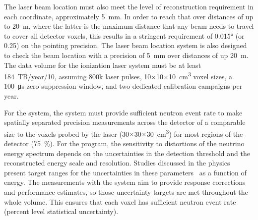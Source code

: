 The laser beam location must also meet the level of reconstruction requirement in each coordinate, approximately \SI{5}{\milli\m}. In order to reach that over distances of up to \SI{20}{\m}, where the latter is the maximum distance that any beam needs to travel to cover all detector voxels, this results in a stringent requirement of \ang{0.015} (or \SI{0.25}{\mrad}) on the pointing precision. The laser beam location system is also designed to check the beam location with a precision of \SI{5}{\milli\m} over distances of up \SI{20}{\m}.
The data volume for the ionization laser system must be at least \num{184}~TB/year/\SI{10}{\kt}, assuming \num{800}k laser pulses, \num{10}$\times$\num{10}$\times$\SI{10}{\cubic\cm} voxel sizes, a \SI{100}{\micro\s} zero suppression window, and two dedicated calibration campaigns per year.

For the  system, the system must provide sufficient neutron event rate to make spatially separated precision measurements across the detector of a comparable size to the voxels probed by the laser (\num{30}$\times$\num{30}$\times$\SI{30}{\cubic\cm}) for most regions of the detector (\SI{75}{\%}). 
For the  program, the sensitivity to distortions of the neutrino energy spectrum depends on the uncertainties in the detection threshold and the reconstructed energy scale and resolution. Studies discussed in the physics  present target ranges for the uncertainties in these parameters~\cite{bib:docdb14068} as a function of energy. The measurements with the  system aim to provide response corrections and performance estimates, so those uncertainty targets are met throughout the whole volume. This ensures that each voxel has sufficient neutron event rate (percent level statistical uncertainty).

